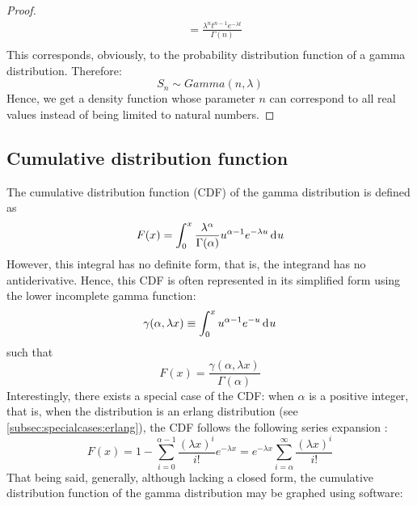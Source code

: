 \documentclass[12pt]{article}
\begin{document}
\begin{proof}
\begin{equation}
\begin{split}
						&=	\frac{\lambda^n t^{n-1} e^{-\lambda t}}{\Gamma(n)}\\
		\end{split}
	\end{equation}
	This corresponds, obviously, to the probability distribution function of a gamma distribution. Therefore:
	\begin{equation}
		S_n \sim Gamma(n, \lambda)
	\end{equation}
	Hence, we get a density function whose parameter $n$ can correspond to all real values instead of being limited to
	natural numbers.
\end{proof}


\pagebreak
\subsection{Cumulative distribution function}\label{subsec:gamma:cdf} The cumulative distribution
function (CDF) of the gamma distribution is defined as
\begin{equation}
	F(x) = \int^x_0\frac{\lambda^\alpha}{\Gamma(\alpha)}u^{\alpha-1}e^{-\lambda u}\mathop{}\!\mathrm{d^{}}u
\end{equation}
However, this integral has no definite form, that is, the integrand has no antiderivative. Hence, this CDF is often
represented in its simplified form using the lower incomplete gamma function\cite{weissteinIncompleteGammaFunction}:
\begin{equation}
	\gamma(\alpha, \lambda x)\equiv\int^x_0u^{\alpha-1}e^{-u}\mathop{}\!\mathrm{d^{}}u
\end{equation}
such that
\begin{equation}
	F(x) = \frac{\gamma(\alpha, \lambda x)}{\Gamma(\alpha)}
\end{equation}
Interestingly, there exists a special case of the CDF: when $\alpha$ is a positive integer, that is, when the distribution
is an erlang distribution (see \autoref{subsec:specialcases:erlang}), the CDF follows the following series expansion
\cite{wikipediaGammaDistribution2022}:
\begin{equation}
	F(x) = 1-\sum^{\alpha-1}_{i=0}\frac{(\lambda x)^i}{i!}e^{-\lambda x} = e^{-\lambda x}\sum^\infty_{i=\alpha}\frac{(\lambda x)^i}{i!}
\end{equation}
That being said, generally, although lacking a closed form, the cumulative distribution function of the gamma
distribution may be graphed using software:
\end{document}
